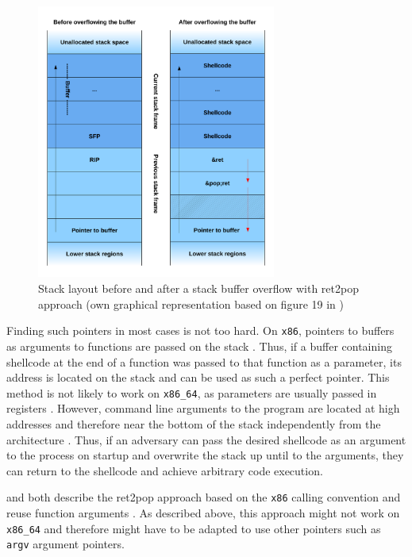 \begin{figure}[htb]
	\centering
	\includegraphics[width=0.7\textwidth]{figures/ret2pop}
	\caption{Stack layout before and after a stack buffer overflow with ret2pop approach (own graphical representation based on figure 19 in \cite[12]{Mueller2008})}
	\label{fig:ret2pop}
\end{figure}

Finding such pointers in most cases is not too hard.
On \texttt{x86}, pointers to buffers as arguments to functions are passed on the stack \cites[11\psq]{Lu2015}[17\psqq]{Fog2019}.
Thus, if a buffer containing shellcode at the end of a function was passed to that function as a parameter, its address is located on the stack and can be used as such a perfect pointer.
This method is not likely to work on \texttt{x86\_64}, as parameters are usually passed in registers \cites[19\psqq]{Lu2018}[17\psqq]{Fog2019}.
However, command line arguments to the program are located at high addresses and therefore near the bottom of the stack independently from the architecture \cites[18\psqq]{Lu2015}[31\psqq]{Lu2018}.
Thus, if an adversary can pass the desired shellcode as an argument to the process on startup and overwrite the stack up until to the arguments, they can return to the shellcode and achieve arbitrary code execution.

 and \citeauthor{Mueller2008} both describe the ret2pop approach based on the \texttt{x86} calling convention and reuse function arguments \cites{Kotler2005}[11\psq]{Mueller2008}.
As described above, this approach might not work on \texttt{x86\_64} and therefore might have to be adapted to use other pointers such as \texttt{argv} argument pointers.

